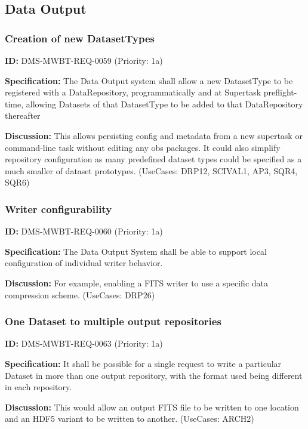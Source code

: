 \documentclass[SE,toc,lsstdraft]{lsstdoc}
\begin{document}
\subsection{Data Output}

\subsubsection{Creation of new DatasetTypes}

\label{DMS-MWBT-REQ-0059}
\textbf{ID:} DMS-MWBT-REQ-0059 (Priority: 1a)

\textbf{Specification:}
The Data Output system shall allow a new DatasetType to be registered with a DataRepository, programmatically and at Supertask preflight-time, allowing Datasets of that DatasetType to be added to that DataRepository thereafter

\textbf{Discussion:}
This allows persisting config and metadata from a new supertask or command-line task without editing any obs packages. It could also simplify repository configuration as many predefined dataset types could be specified as a much smaller of dataset prototypes. (UseCases: DRP12, SCIVAL1, AP3, SQR4, SQR6)

\subsubsection{Writer configurability}

\label{DMS-MWBT-REQ-0060}
\textbf{ID:} DMS-MWBT-REQ-0060 (Priority: 1a)

\textbf{Specification:}
The Data Output System shall be able to support local configuration of individual writer behavior.

\textbf{Discussion:}
For example, enabling a FITS writer to use a specific data compression scheme. (UseCases: DRP26)

\subsubsection{One Dataset to multiple output repositories}

\label{DMS-MWBT-REQ-0063}
\textbf{ID:} DMS-MWBT-REQ-0063 (Priority: 1a)

\textbf{Specification:}
It shall be possible for a single request to write a particular Dataset in more than one output repository, with the format used being different in each repository.

\textbf{Discussion:}
This would allow an output FITS file to be written to one location and an HDF5 variant to be written to another. (UseCases: ARCH2)
\end{document}
